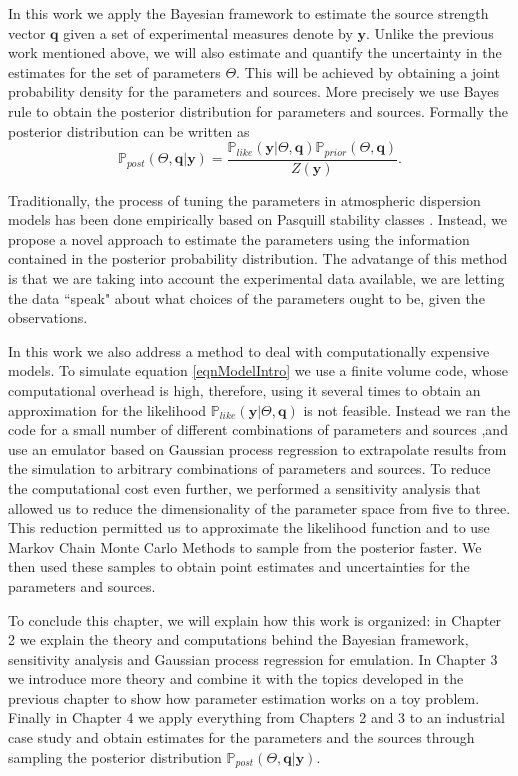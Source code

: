 \documentclass[12pt]{book}
\newcommand{\post}{\mathbb{P}_{post}}
\newcommand{\like}{\mathbb{P}_{like}}
\newcommand{\prior}{\mathbb{P}_{prior}}
\newcommand{\q}{\textbf{q}}
\newcommand{\y}{\textbf{y}}
\begin{document}
In this work we apply the Bayesian framework  to estimate the source 
strength vector $\q$
given a set of experimental measures denote by $\y$. Unlike
the previous work mentioned above, we will also  estimate and
quantify the uncertainty in the estimates for the set of parameters $\Theta$.
This will be achieved by obtaining a joint probability
density for the parameters  and sources.  More precisely
we use Bayes rule to obtain the posterior distribution for parameters
and sources. Formally the posterior distribution can be written as
\begin{equation*}
\post(\Theta,\q|\y)=\frac{\like(\y|\Theta,\q)\prior(\Theta,\q)}{Z(\y)}.
\end{equation*}

Traditionally, the process of tuning the parameters in atmospheric dispersion models has been done
empirically based on Pasquill stability classes \cite{turner1994workbook, seinfeld1998atmospheric}.
Instead, we propose a novel approach to estimate
the parameters using the information contained in the posterior probability distribution. 
The advatange of this method is that we are taking into account the experimental data 
available, we are letting the data ``speak" about what choices of the parameters
ought to be, given the observations.

In this work we also address a method to deal with computationally expensive models.
To simulate equation \eqref{eqnModelIntro} we use a finite volume code, whose
computational overhead is high, therefore, using it several times to obtain an approximation for
the likelihood $\like(\y|\Theta,\q)$ is not feasible. Instead we ran the code 
for a small  number of different
combinations of parameters and sources ,and use an emulator based
on Gaussian process regression to extrapolate results
from the simulation to arbitrary combinations of parameters and sources. To 
reduce the computational cost even further, we performed
a sensitivity analysis that allowed us to reduce the dimensionality
of the parameter space from five to three. This reduction permitted 
us to approximate the likelihood function  and to use Markov
Chain Monte Carlo Methods to sample from the posterior faster.
We then used these samples to obtain point estimates and uncertainties
for the parameters and sources.

To conclude this chapter, we will explain how this work is organized:
in Chapter 2 we explain the theory and computations behind the
Bayesian framework, sensitivity analysis and Gaussian process regression for
emulation. In Chapter 3 we introduce more theory and combine it with the topics 
developed in the previous chapter to show how parameter estimation works
on a toy problem. Finally in 
Chapter 4 we apply everything from Chapters 2 and 3 to an
industrial case study and obtain estimates for the parameters
and the sources through sampling the posterior distribution $\post(\Theta,\q|\y)$.
\end{document}
